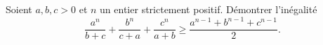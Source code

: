 Soient $a, b, c > 0$ et $n$ un entier strictement positif. Démontrer l'inégalité
\[ \frac{a^n}{b + c} + \frac{b^n}{c + a} + \frac{c^n}{a + b} \geq \frac{a^{n-1} + b^{n-1} + c^{n-1}}{2}. \]

